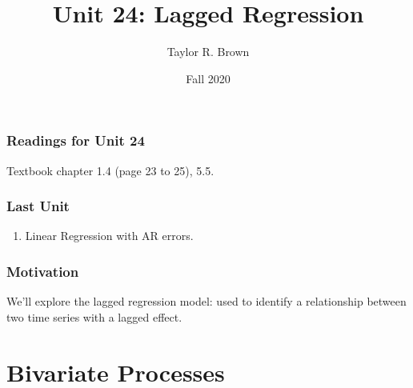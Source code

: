 \documentclass[%
xcolor=pdftex]{beamer}
\title{Unit 24: Lagged Regression}
\author[STAT 5170: Applied Time Series, Unit 26]{Taylor R. Brown}
\institute{Department of Statistics, University of Virginia}
\date{Fall 2020}
\begin{document}
\frame{\titlepage}


\begin{frame}
\frametitle{Readings for Unit 24}

Textbook chapter 1.4 (page 23 to 25), 5.5.

\end{frame}


\begin{frame}
\frametitle{Last Unit}
\begin{enumerate}
\item Linear Regression with AR errors.
\end{enumerate}
\end{frame}

\begin{frame}
\frametitle{Motivation}

We'll explore the lagged regression model: used to identify a relationship between two time series with a lagged effect.


\end{frame}

\section{Bivariate Processes}
\frame{\tableofcontents[currentsection]}








\end{document}
